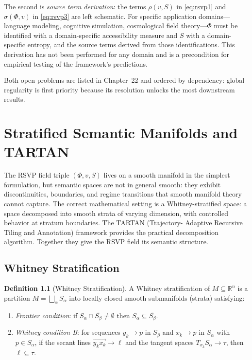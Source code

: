 \documentclass[12pt, oneside]{book}
\theoremstyle{flyxion}
\theoremstyle{definition}
\newtheorem{definition}[theorem]{Definition}
\begin{document}
The second is \textit{source term derivation}: the terms
$\rho(v, S)$ in \eqref{eq:rsvp1} and $\sigma(\Phi, v)$
in \eqref{eq:rsvp3} are left schematic. For specific
application domains---language modeling, cognitive
simulation, cosmological field theory---$\Phi$ must be
identified with a domain-specific accessibility measure
and $S$ with a domain-specific entropy, and the source
terms derived from those identifications. This derivation
has not been performed for any domain and is a precondition
for empirical testing of the framework's predictions.

Both open problems are listed in Chapter~22 and ordered
by dependency: global regularity is first priority because
its resolution unlocks the most downstream results.

\chapter{Stratified Semantic Manifolds and TARTAN}

The RSVP field triple $(\Phi, v, S)$ lives on a smooth
manifold in the simplest formulation, but semantic spaces
are not in general smooth: they exhibit discontinuities,
boundaries, and regime transitions that smooth manifold
theory cannot capture. The correct mathematical setting
is a Whitney-stratified space: a space decomposed into
smooth strata of varying dimension, with controlled
behavior at stratum boundaries. The TARTAN (Trajectory-
Adaptive Recursive Tiling and Annotation) framework
provides the practical decomposition algorithm. Together
they give the RSVP field its semantic structure.

\section{Whitney Stratification}

\begin{definition}[Whitney Stratification]
A Whitney stratification of $M \subseteq \mathbb{R}^n$
is a partition $M = \bigsqcup_\alpha S_\alpha$ into
locally closed smooth submanifolds (strata) satisfying:
\begin{enumerate}
\item[(i)] \emph{Frontier condition}: if $S_\alpha \cap
   \overline{S_\beta} \neq \emptyset$ then
   $S_\alpha \subseteq \overline{S_\beta}$.
\item[(ii)] \emph{Whitney condition B}: for sequences
   $y_k \to p$ in $S_\beta$ and $x_k \to p$ in $S_\alpha$
   with $p \in S_\alpha$, if the secant lines
   $\overrightarrow{y_k x_k} \to \ell$ and the tangent
   spaces $T_{x_k} S_\alpha \to \tau$, then $\ell \subseteq
   \tau$.
\end{enumerate}
\end{definition}
\end{document}
